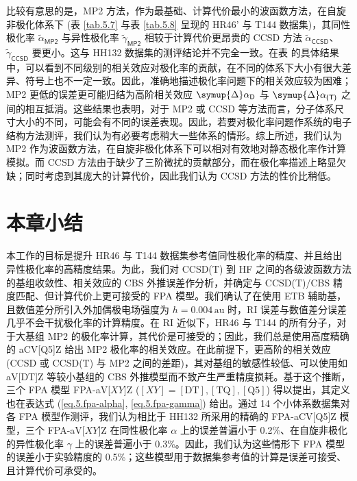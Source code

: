比较有意思的是，MP2 方法，作为最基础、计算代价最小的波函数方法，在自旋非极化体系下 (表 \ref{tab.5.7} 与表 \ref{tab.5.8} 呈现的 HR46' 与 T144 数据集)，其同性极化率 $\tilde \alpha_\textsf{MP2}$ 与异性极化率 $\tilde \gamma_\textsf{MP2}$ 相较于计算代价更昂贵的 CCSD 方法 $\tilde \alpha_\textsf{CCSD}$、$\tilde \gamma_\textsf{CCSD}$ 要更小。这与 HH132 数据集的测评结论并不完全一致\cite{Hait-Head-Gordon.PCCP.2018}。在表  的具体结果中，可以看到不同级别的相关效应对极化率的贡献，在不同的体系下大小有很大差异、符号上也不一定一致。因此，准确地描述极化率问题下的相关效应较为困难；MP2 更低的误差更可能归结为高阶相关效应 $\symup{\Delta} \alpha_\textsf{D}$ 与 $\symup{\Delta} \alpha_\textsf{(T)}$ 之间的相互抵消。这些结果也表明，对于 MP2 或 CCSD 等方法而言，分子体系尺寸大小的不同，可能会有不同的误差表现。因此，若要对极化率问题作系统的电子结构方法测评，我们认为有必要考虑稍大一些体系的情形。综上所述，我们认为 MP2 作为波函数方法，在自旋非极化体系下可以相对有效地对静态极化率作计算模拟。而 CCSD 方法由于缺少了三阶微扰的贡献部分，而在极化率描述上略显欠缺；同时考虑到其庞大的计算代价，因此我们认为 CCSD 方法的性价比稍低。

\section{本章小结}

本工作的目标是提升 HR46 与 T144 数据集参考值同性极化率的精度、并且给出异性极化率的高精度结果。为此，我们对 CCSD(T) 到 HF 之间的各级波函数方法的基组收敛性、相关效应的 CBS 外推误差作分析，并确定与 CCSD(T)/CBS 精度匹配、但计算代价上更可接受的 FPA 模型。我们确认了在使用 ETB 辅助基，且数值差分所引入外加偶极电场强度为 $h = 0.004 \, \text{au}$ 时，RI 误差与数值差分误差几乎不会干扰极化率的计算精度。在 RI 近似下，HR46 与 T144 的所有分子，对于大基组 MP2 的极化率计算，其代价是可接受的；因此，我们总是使用高度精确的 aCV[Q5]Z 给出 MP2 极化率的相关效应。在此前提下，更高阶的相关效应 (CCSD 或 CCSD(T) 与 MP2 之间的差距)，其对基组的敏感性较低、可以使用如 aV[DT]Z 等较小基组的 CBS 外推模型而不致产生严重精度损耗。基于这个推断，三个 FPA 模型 FPA-aV[$XY$]Z ($[XY] = \mathrm{[DT], [TQ], [Q5]}$) 得以提出，其定义也在表达式 (\ref{eq.5.fpa-alpha}, \ref{eq.5.fpa-gamma}) 给出。通过 14 个小体系数据集对各 FPA 模型作测评，我们认为相比于 HH132 所采用的精确的 FPA-aCV[Q5]Z 模型，三个 FPA-aV[$XY$]Z 在同性极化率 $\alpha$ 上的误差普遍小于 0.2\%、在自旋非极化的异性极化率 $\gamma$ 上的误差普遍小于 0.3\%。因此，我们认为这些情形下 FPA 模型的误差小于实验精度的 0.5\%；这些模型用于数据集参考值的计算是误差可接受、且计算代价可承受的。

